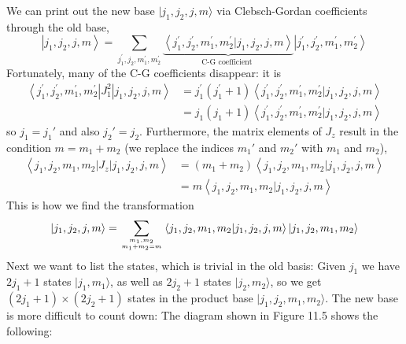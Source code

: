 We can print out the new base $| j_1, j_2, j, m\rangle$ via Clebsch-Gordan coefficients through the old base,
\begin{equation}
    \left|j_{1}, j_{2}, j, m\right\rangle=\sum_{j_{1}^{\prime}, j_{2}, m_{1}^{\prime}, m_{2}^{\prime}} \underbrace{\left\langle j_{1}^{\prime}, j_{2}^{\prime}, m_{1}^{\prime}, m_{2}^{\prime} | j_{1}, j_{2}, j, m\right\rangle}_{\text {C-G coefficient }}\left|j_{1}^{\prime}, j_{2}^{\prime}, m_{1}^{\prime}, m_{2}^{\prime}\right\rangle
    \end{equation}
Fortunately, many of the C-G coefficients disappear: it is
\begin{equation}
\begin{aligned}\left\langle j_{1}^{\prime}, j_{2}^{\prime}, m_{1}^{\prime}, m_{2}^{\prime}\left|J_{1}^{2}\right| j_{1}, j_{2}, j, m\right\rangle &= j_{1}^{\prime}\left(j_{1}^{\prime}+1\right)\left\langle j_{1}^{\prime}, j_{2}^{\prime}, m_{1}^{\prime}, m_{2}^{\prime} | j_{1}, j_{2}, j, m\right\rangle \\ &= j_{1}\left(j_{1}+1\right)\left\langle j_{1}^{\prime}, j_{2}^{\prime}, m_{1}^{\prime}, m_{2}^{\prime} | j_{1}, j_{2}, j, m\right\rangle \end{aligned} \nonumber
\end{equation}
so $j_1 = j_1'$ and also $j_2' = j_2$. Furthermore, the matrix elements of $J_z$ result in the condition $m = m_1 + m_2$ (we replace the indices $m_1'$ and $m_2'$ with $m_1$ and $m_2$),
\begin{equation}
\begin{aligned}\left\langle j_{1}, j_{2}, m_{1}, m_{2}\left|J_{z}\right| j_{1}, j_{2}, j, m\right\rangle &=\left(m_{1}+m_{2}\right)\left\langle j_{1}, j_{2}, m_{1}, m_{2} | j_{1}, j_{2}, j, m\right\rangle \\ &= m\left\langle j_{1}, j_{2}, m_{1}, m_{2} | j_{1}, j_{2}, j, m\right\rangle \end{aligned}
\end{equation}
This is how we find the transformation
\begin{equation}
    \left|j_{1}, j_{2}, j, m\right\rangle=\sum_{m_{1}, m_{2} \atop m_{1}+m_{2}=m}\left\langle j_{1}, j_{2}, m_{1}, m_{2} | j_{1}, j_{2}, j, m\right\rangle\left|j_{1}, j_{2}, m_{1}, m_{2}\right\rangle
    \end{equation}
Next we want to list the states, which is trivial in the old basis: Given $j_1$ we have $2j_1 + 1$ states $| j_1, m_1\rangle$, as well as $2j_2 + 1$ states $| j_2, m_2\rangle$, so we get $(2j_1 + 1) × (2j_2 + 1)$ states in the product base $| j_1, j_2, m_1, m_2\rangle$. The new base is more difficult to count down: The diagram shown in Figure 11.5 shows the following:
